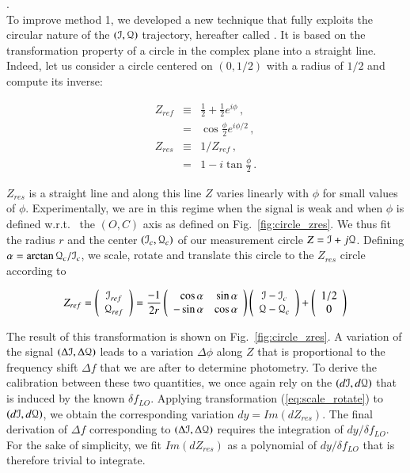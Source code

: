 .\\

To improve method 1, we developed a new technique that fully exploits the circular
nature of the $(\mathcal{I},\mathcal{Q})$ trajectory, hereafter called \cf. It is
  based on the transformation property of a circle in the complex plane into a
  straight line. Indeed, let us consider a circle centered on $(0,1/2)$ with a
  radius of $1/2$ and compute its inverse:

\begin{eqnarray}
Z_{ref} &\equiv&\frac{1}{2} + \frac{1}{2}e^{i\phi}\,, \\
&=&\cos\frac{\phi}{2}e^{i\phi/2}\,,\\
Z_{res} &\equiv& 1/Z_{ref}\,, \label{eq:z_res} \\
&=&1-i\tan\frac{\phi}{2}\,.
\label{eq:z_res}
\end{eqnarray}

$Z_{res}$ is a straight line and along this line $Z$ varies linearly with
$\phi$ for small values of $\phi$. Experimentally, we are in this regime
when the signal is weak and when $\phi$ is defined w.r.t.~ the $(O,C)$ axis
as defined on Fig.~\ref{fig:circle_zres}. We thus fit the radius $r$ and the
center $(\mathcal{I}_c,\mathcal{Q}_c)$ of our measurement circle $Z=\mathcal{I}+j\mathcal{Q}$. Defining
$\alpha=\arctan\mathcal{Q}_c/\mathcal{I}_c$, we scale, rotate and translate this
circle to the $Z_{res}$ circle according to

\begin{equation}
Z_{ref} = \left(\begin{array}{c}
\mathcal{I}_{ref}\\
\mathcal{Q}_{ref}\end{array}\right) = 
\frac{-1}{2r}\left(\begin{array}{rr}
\cos\alpha & \sin\alpha\\
-\sin\alpha & \cos\alpha\end{array}\right)
\left(\begin{array}{c}
\mathcal{I}-\mathcal{I}_c\\
\mathcal{Q}-\mathcal{Q}_c\end{array}\right) +
\left(\begin{array}{c}
1/2\\
0\end{array}\right)
\label{eq:scale_rotate}
\end{equation}

The result of this transformation is shown on Fig.~\ref{fig:circle_zres}. A
variation of the signal $(\Delta\mathcal{I},\Delta\mathcal{Q})$ leads to a variation
$\Delta\phi$ along $Z$ that is proportional to the frequency shift $\Delta f$
that we are after to determine photometry. To derive the calibration between
these two quantities, we once again rely on the $(d\mathcal{I},d\mathcal{Q})$ that is induced by
the known $\delta f_{LO}$. Applying transformation (\ref{eq:scale_rotate}) to
$(d\mathcal{I},d\mathcal{Q})$, we obtain the corresponding variation $dy = Im(dZ_{res})$. The
final derivation of $\Delta f$ corresponding to $(\Delta\mathcal{I},\Delta\mathcal{Q})$ requires
the integration of $dy/\delta f_{LO}$. For the sake of simplicity, we fit
$Im(dZ_{res})$ as a polynomial of $dy/\delta f_{LO}$ that is therefore trivial
to integrate.

